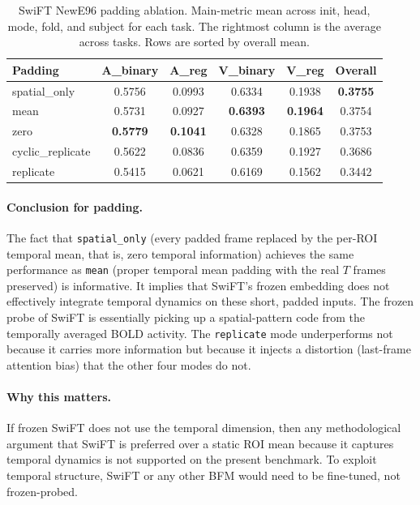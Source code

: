 \documentclass[11pt, a4paper]{article}
\begin{document}
\begin{table}[h]
\centering
\caption{SwiFT NewE96 padding ablation. Main-metric mean across init, head, mode, fold,
and subject for each task. The rightmost column is the average across tasks. Rows are
sorted by overall mean.}
\label{tab:padding}
\small
\begin{tabular}{lS[table-format=1.4]S[table-format=1.4]S[table-format=1.4]S[table-format=1.4]S[table-format=1.4]}
\toprule
Padding & {A\_binary} & {A\_reg} & {V\_binary} & {V\_reg} & {Overall} \\
\midrule
spatial\_only      & 0.5756 & 0.0993 & 0.6334 & 0.1938 & \bfseries 0.3755 \\
mean               & 0.5731 & 0.0927 & \bfseries 0.6393 & \bfseries 0.1964 & 0.3754 \\
zero               & \bfseries 0.5779 & \bfseries 0.1041 & 0.6328 & 0.1865 & 0.3753 \\
cyclic\_replicate  & 0.5622 & 0.0836 & 0.6359 & 0.1927 & 0.3686 \\
replicate          & 0.5415 & 0.0621 & 0.6169 & 0.1562 & 0.3442 \\
\bottomrule
\end{tabular}
\end{table}

\paragraph{Conclusion for padding.}
The fact that \texttt{spatial\_only} (every padded frame replaced by the per-ROI temporal
mean, that is, zero temporal information) achieves the same performance as \texttt{mean}
(proper temporal mean padding with the real $T$ frames preserved) is informative. It
implies that SwiFT's frozen embedding does not effectively integrate temporal dynamics on
these short, padded inputs. The frozen probe of SwiFT is essentially picking up a
spatial-pattern code from the temporally averaged BOLD activity. The \texttt{replicate}
mode underperforms not because it carries more information but because it injects a
distortion (last-frame attention bias) that the other four modes do not.

\paragraph{Why this matters.}
If frozen SwiFT does not use the temporal dimension, then any methodological argument that
SwiFT is preferred over a static ROI mean because it captures temporal dynamics is not
supported on the present benchmark. To exploit temporal structure, SwiFT or any other BFM
would need to be fine-tuned, not frozen-probed.
\end{document}
